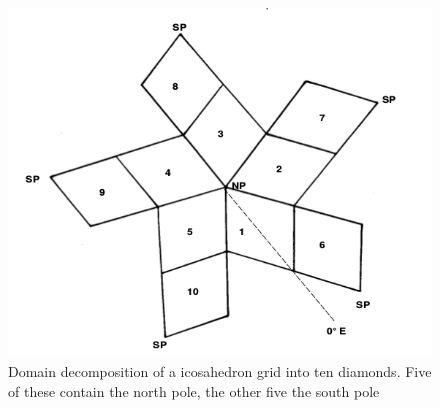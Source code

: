 \documentclass{book}
\begin{document}
\begin{figure}[htb!]
	\begin{center}
		\includegraphics[width=14cm]{fig/IcosahedralDecomposition.png}
		\caption{Domain decomposition of a icosahedron grid into ten diamonds.
			Five of these contain the north pole, the other five the south pole}
		\label{fig:IcosahedralDecomposition}
	\end{center}
\end{figure}
\end{document}
